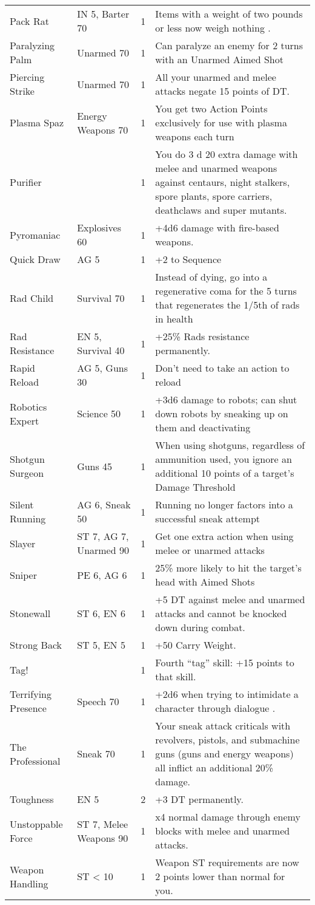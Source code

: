\begin{longtable}{|p{3.3cm}|p{3.1cm}|p{1.2cm}|p{8.4cm}|}
Pack Rat & IN 5, Barter 70 & 1 & Items with a weight of two pounds or less now weigh nothing . \\
Paralyzing Palm & Unarmed 70 & 1 & Can paralyze an enemy for 2 turns with an Unarmed Aimed Shot \\
Piercing Strike & Unarmed 70 & 1 & All your unarmed and melee attacks negate 15 points of DT. \\
Plasma Spaz & Energy Weapons 70 & 1 & You get two Action Points exclusively for use with plasma weapons each turn \\
Purifier & & 1 & You do 3 d 20 extra damage with melee and unarmed weapons against centaurs, night stalkers, spore plants, spore carriers, deathclaws and super mutants. \\
Pyromaniac & Explosives 60 & 1 & +4d6 damage with fire-based weapons. \\
Quick Draw & AG 5 & 1 & +2 to Sequence \\
Rad Child & Survival 70 & 1 & Instead of dying, go into a regenerative coma for the 5 turns that regenerates the 1/5th of rads in health \\
Rad Resistance & EN 5, Survival 40 & 1 & +25\% Rads resistance permanently. \\
Rapid Reload & AG 5, Guns 30 & 1 & Don’t need to take an action to reload \\
Robotics Expert & Science 50 & 1 & +3d6 damage to robots; can shut down robots by sneaking up on them and deactivating \\
Shotgun Surgeon & Guns 45 & 1 & When using shotguns, regardless of ammunition used, you ignore an additional 10 points of a target's Damage Threshold \\
Silent Running & AG 6, Sneak 50 & 1 & Running no longer factors into a successful sneak attempt \\
Slayer & ST 7, AG 7, Unarmed 90 & 1 & Get one extra action when using melee or unarmed attacks \\
Sniper & PE 6, AG 6 & 1 & 25\% more likely to hit the target's head with Aimed Shots \\
Stonewall & ST 6, EN 6 & 1 & +5 DT against melee and unarmed attacks and cannot be knocked down during combat. \\
Strong Back & ST 5, EN 5 & 1 & +50 Carry Weight. \\
Tag! & & 1 & Fourth ``tag'' skill: +15 points to that skill. \\
Terrifying Presence & Speech 70 & 1 & +2d6 when trying to intimidate a character through dialogue . \\
The Professional & Sneak 70 & 1 & Your sneak attack criticals with revolvers, pistols, and submachine guns (guns and energy weapons) all inflict an additional 20\% damage. \\
Toughness & EN 5 & 2 & +3 DT permanently. \\
Unstoppable Force & ST 7, Melee Weapons 90 & 1 & x4 normal damage through enemy blocks with melee and unarmed attacks. \\
Weapon Handling & ST < 10 & 1 & Weapon ST requirements are now 2 points lower than normal for you. \\

\hline
\end{longtable}
